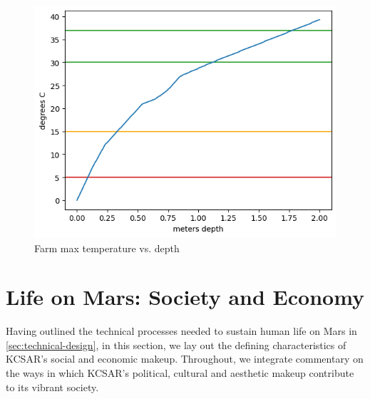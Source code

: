 \documentclass[fleqn,10pt]{Stylesheet} %
\begin{document}
\begin{figure}
    \centering
    \includegraphics[width=\linewidth]{figures/fig_bp.png}
    \caption{Farm max temperature vs. depth}
    \label{fig:farm}
\end{figure}






\section{Life on Mars: Society and Economy}
Having outlined the technical processes needed to sustain human life on Mars in \ref{sec:technical-design}, in this section, we lay out the defining characteristics of KCSAR's social and economic makeup. Throughout, we integrate commentary on the ways in which KCSAR's political, cultural and aesthetic makeup contribute to its vibrant society.
\end{document}
